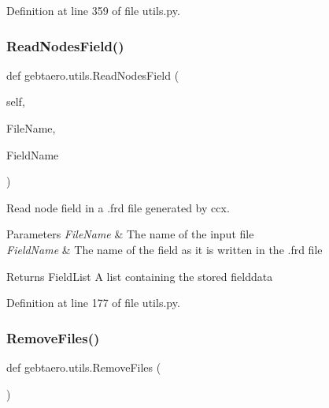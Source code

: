 Definition at line 359 of file utils.\+py.

\mbox{\label{namespacegebtaero_1_1utils_a09e606c50b30d67220853c2340124990}} 
\subsubsection{\texorpdfstring{Read\+Nodes\+Field()}{ReadNodesField()}}
{\footnotesize\ttfamily def gebtaero.\+utils.\+Read\+Nodes\+Field (\begin{DoxyParamCaption}\item[{}]{self,  }\item[{}]{File\+Name,  }\item[{}]{Field\+Name }\end{DoxyParamCaption})}



Read node field in a .frd file generated by ccx. 


\begin{DoxyParams}{Parameters}
{\em File\+Name} & The name of the input file \\
\hline
{\em Field\+Name} & The name of the field as it is written in the .frd file \\
\hline
\end{DoxyParams}
\begin{DoxyReturn}{Returns}
Field\+List A list containing the stored fielddata 
\end{DoxyReturn}


Definition at line 177 of file utils.\+py.

\mbox{\label{namespacegebtaero_1_1utils_a14f397a623bb26fcf8b4dcd64228aa05}} 
\subsubsection{\texorpdfstring{Remove\+Files()}{RemoveFiles()}}
{\footnotesize\ttfamily def gebtaero.\+utils.\+Remove\+Files (\begin{DoxyParamCaption}{ }\end{DoxyParamCaption})}



